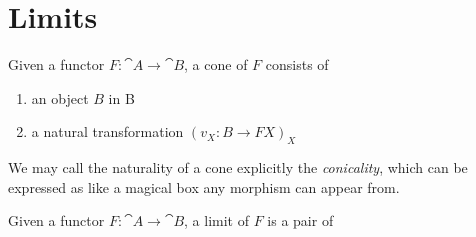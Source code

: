 
\section{Limits}

\begin{definition}[Cone]
\label{cone}
Given a functor $F : \cat A \to \cat B$, a cone of $F$ consists of
\begin{enumerate}
    \item an object $B$ in \cat B
    \item a natural transformation $(v _ X : B \to FX) _ X$
\end{enumerate}
\end{definition}

\begin{definition}[Conicality]
\label{conicality}
We may call the naturality of a cone explicitly the \emph{conicality}, which can be expressed as
like a magical box any morphism can appear from.
\end{definition}

\begin{definition}[Limit]
\label{limit}
Given a functor $F : \cat A \to \cat B$, a limit of $F$ is a pair of
\end{definition}

